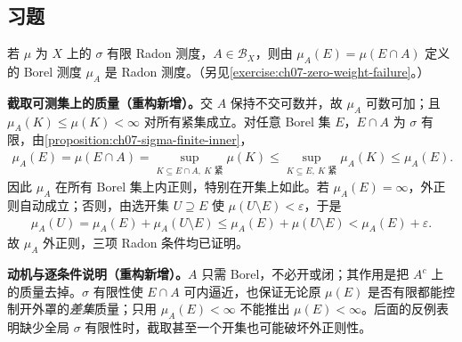 \documentclass[../../main.tex]{subfiles}
\begin{document}
\subsection*{习题}
\begin{exercise}\label{exercise:ch07-restricted-radon}
若 $\mu$ 为 $X$ 上的 $\sigma$ 有限 Radon 测度，$A\in\mathscr B_X$，则由 $\mu_A(E)=\mu(E\cap A)$ 定义的 Borel 测度 $\mu_A$ 是 Radon 测度。（另见\cref{exercise:ch07-zero-weight-failure}。）
\end{exercise}
\begin{solution}
\textbf{截取可测集上的质量（重构新增）。}交 $A$ 保持不交可数并，故 $\mu_A$ 可数可加；且 $\mu_A(K)\leqslant\mu(K)<\infty$ 对所有紧集成立。对任意 Borel 集 $E$，$E\cap A$ 为 $\sigma$ 有限，由\cref{proposition:ch07-sigma-finite-inner}，
\begin{align*}
\mu_A(E)=\mu(E\cap A)=\sup_{K\subseteq E\cap A,\ K\text{ 紧}}\mu(K)
\leqslant\sup_{K\subseteq E,\ K\text{ 紧}}\mu_A(K)\leqslant\mu_A(E).
\end{align*}
因此 $\mu_A$ 在所有 Borel 集上内正则，特别在开集上如此。若 $\mu_A(E)=\infty$，外正则自动成立；否则，由选开集 $U\supseteq E$ 使 $\mu(U\setminus E)<\varepsilon$，于是
\begin{align*}
\mu_A(U)=\mu_A(E)+\mu_A(U\setminus E)
\leqslant\mu_A(E)+\mu(U\setminus E)<\mu_A(E)+\varepsilon.
\end{align*}
故 $\mu_A$ 外正则，三项 Radon 条件均已证明。
\end{solution}
\begin{remark}
\textbf{动机与逐条件说明（重构新增）。}$A$ 只需 Borel，不必开或闭；其作用是把 $A^c$ 上的质量去掉。$\sigma$ 有限性使 $E\cap A$ 可内逼近，也保证无论原 $\mu(E)$ 是否有限都能控制开外罩的\emph{差集}质量；只用 $\mu_A(E)<\infty$ 不能推出 $\mu(E)<\infty$。后面的反例表明缺少全局 $\sigma$ 有限性时，截取甚至一个开集也可能破坏外正则性。
\end{remark}
\end{document}
